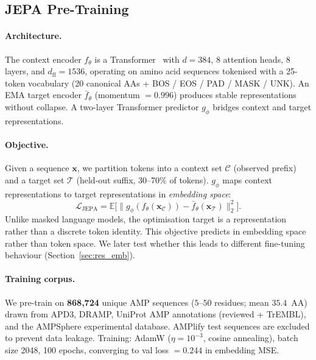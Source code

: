 \subsection{JEPA Pre-Training}
\label{sec:pretrain}

\paragraph{Architecture.}
The context encoder $f_\theta$ is a Transformer~\citep{vaswani} with
$d{=}384$, $8$ attention heads, $8$ layers, and $d_\text{ff}{=}1536$,
operating on amino acid sequences tokenised with a 25-token vocabulary
(20 canonical AAs + BOS / EOS / PAD / MASK / UNK).
An EMA target encoder $\bar{f}_\theta$ (momentum $= 0.996$) produces stable
representations without collapse.
A two-layer Transformer predictor $g_\phi$ bridges context and target
representations.

\paragraph{Objective.}
Given a sequence $\mathbf{x}$, we partition tokens into a context set
$\mathcal{C}$ (observed prefix) and a target set $\mathcal{T}$
(held-out suffix, 30--70\% of tokens).
$g_\phi$ maps context representations to target representations in
\emph{embedding space}:
\begin{equation}
  \mathcal{L}_\text{JEPA} =
  \mathbb{E}\bigl[\|g_\phi(f_\theta(\mathbf{x}_\mathcal{C})) -
  \bar{f}_\theta(\mathbf{x}_\mathcal{T})\|_2^2\bigr].
  \label{eq:jepa}
\end{equation}
Unlike masked language models, the optimisation target is a representation
rather than a discrete token identity.
This objective predicts in embedding space rather than token space.
We later test whether this leads to different fine-tuning behaviour
(Section~\ref{sec:res_emb}).

\paragraph{Training corpus.}
We pre-train on \textbf{868{,}724} unique AMP sequences ($5$--$50$ residues;
mean $35.4$~AA) drawn from APD3, DRAMP, UniProt AMP annotations (reviewed +
TrEMBL), and the AMPSphere experimental database.
AMPlify test sequences are excluded to prevent data leakage.
Training: AdamW ($\eta = 10^{-3}$, cosine annealing), batch size 2048,
100 epochs, converging to val loss $= 0.244$ in embedding MSE.
